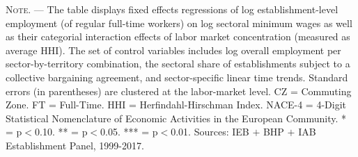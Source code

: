 \documentclass[11pt,oneside,reqno,xcolor=dvipsnames]{article} %
\begin{document}
\begin{appendix}
\begin{refsection}
\begin{table}[!ht]
{\begin{threeparttable}
\begin{tablenotes}
\item \footnotesize \textsc{Note. ---} The table displays fixed effects regressions of log establishment-level employment (of regular full-time workers) on log sectoral minimum wages as well as their categorial interaction effects of labor market concentration (measured as average HHI). The set of control variables includes log overall employment per sector-by-territory combination, the sectoral share of establishments subject to a collective bargaining agreement, and sector-specific linear time trends. Standard errors (in parentheses) are clustered at the labor-market level. CZ = Commuting Zone. FT = Full-Time. HHI = Herfindahl-Hirschman Index. NACE-4 = 4-Digit Statistical Nomenclature of Economic Activities in the European Community. * = p$<$0.10. ** = p$<$0.05. *** = p$<$0.01. Sources: IEB $\plus$ BHP $\plus$ IAB Establishment Panel, 1999-2017.
\end{tablenotes}
\end{threeparttable}
}
\end{table}



\vspace*{2.5cm}
\vspace*{\fill}

\begin{landscape}

\clearpage
\vspace*{\fill}



\end{landscape}
\end{refsection}
\end{appendix}
\end{document}
